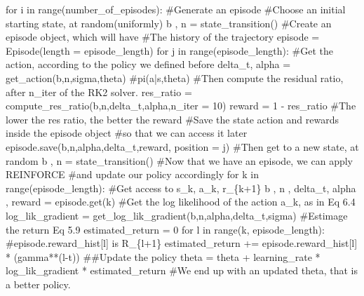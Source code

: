 \documentclass[
  letterpaper,
]{report}
\newenvironment{Shaded}{\begin{snugshade}}{\end{snugshade}}
\newcommand{\BuiltInTok}[1]{\textcolor[rgb]{0.00,0.23,0.31}{#1}}
\newcommand{\CommentTok}[1]{\textcolor[rgb]{0.37,0.37,0.37}{#1}}
\newcommand{\ControlFlowTok}[1]{\textcolor[rgb]{0.00,0.23,0.31}{#1}}
\newcommand{\DecValTok}[1]{\textcolor[rgb]{0.68,0.00,0.00}{#1}}
\newcommand{\KeywordTok}[1]{\textcolor[rgb]{0.00,0.23,0.31}{#1}}
\newcommand{\NormalTok}[1]{\textcolor[rgb]{0.00,0.23,0.31}{#1}}
\newcommand{\OperatorTok}[1]{\textcolor[rgb]{0.37,0.37,0.37}{#1}}
\theoremstyle{plain}
\theoremstyle{definition}
\theoremstyle{definition}
\theoremstyle{remark}
\begin{document}
\begin{Shaded}
\begin{Highlighting}[]
\ControlFlowTok{for}\NormalTok{ i }\KeywordTok{in} \BuiltInTok{range}\NormalTok{(number\_of\_episodes):}
    \CommentTok{\#Generate an episode}
    \CommentTok{\#Choose an initial starting state, at random(uniformly)}
\NormalTok{    b , n }\OperatorTok{=}\NormalTok{ state\_transition()}
    \CommentTok{\#Create an episode object, which will have }
    \CommentTok{\#The history of the trajectory}
\NormalTok{    episode }\OperatorTok{=}\NormalTok{ Episode(length }\OperatorTok{=}\NormalTok{ episode\_length)}
    \ControlFlowTok{for}\NormalTok{ j }\KeywordTok{in} \BuiltInTok{range}\NormalTok{(episode\_length):}
        \CommentTok{\#Get the action, according to the policy we defined before}
\NormalTok{        delta\_t, alpha }\OperatorTok{=}\NormalTok{ get\_action(b,n,sigma,theta) }\CommentTok{\#pi(a|s,theta)}
        \CommentTok{\#Then compute the residual ratio, after n\_iter of the RK2 solver.}
\NormalTok{        res\_ratio }\OperatorTok{=}\NormalTok{ compute\_res\_ratio(b,n,delta\_t,alpha,n\_iter }\OperatorTok{=} \DecValTok{10}\NormalTok{)}
\NormalTok{        reward }\OperatorTok{=} \DecValTok{1} \OperatorTok{{-}}\NormalTok{ res\_ratio }\CommentTok{\#The lower the res ratio, the better the reward}
        \CommentTok{\#Save the state action and rewards inside the episode object}
        \CommentTok{\#so that we can access it later}
\NormalTok{        episode.save(b,n,alpha,delta\_t,reward, position }\OperatorTok{=}\NormalTok{ j)}
        \CommentTok{\#Then get to a new state, at random}
\NormalTok{        b , n }\OperatorTok{=}\NormalTok{ state\_transition()}
    \CommentTok{\#Now that we have an episode, we can apply REINFORCE}
    \CommentTok{\#and update our policy accordingly}
    \ControlFlowTok{for}\NormalTok{ k }\KeywordTok{in} \BuiltInTok{range}\NormalTok{(episode\_length):}
        \CommentTok{\#Get access to s\_k, a\_k, r\_\{k+1\}}
\NormalTok{        b , n , delta\_t, alpha , reward }\OperatorTok{=}\NormalTok{ episode.get(k)}
        \CommentTok{\#Get the log likelihood of the action a\_k, as in Eq 6.4}
\NormalTok{        log\_lik\_gradient }\OperatorTok{=}\NormalTok{ get\_log\_lik\_gradient(b,n,alpha,delta\_t,sigma)}
        \CommentTok{\#Estimage the return Eq 5.9}
\NormalTok{        estimated\_return }\OperatorTok{=} \DecValTok{0}
        \ControlFlowTok{for}\NormalTok{ l }\KeywordTok{in} \BuiltInTok{range}\NormalTok{(k, episode\_length):}
            \CommentTok{\#episode.reward\_hist[l] is R\_\{l+1\}}
\NormalTok{            estimated\_return }\OperatorTok{+=}\NormalTok{ episode.reward\_hist[l] }\OperatorTok{*}\NormalTok{ (gamma}\OperatorTok{**}\NormalTok{(l}\OperatorTok{{-}}\NormalTok{t))}
        \CommentTok{\#\#Update the policy}
\NormalTok{        theta }\OperatorTok{=}\NormalTok{ theta }\OperatorTok{+}\NormalTok{ learning\_rate }\OperatorTok{*}\NormalTok{ log\_lik\_gradient }\OperatorTok{*}\NormalTok{ estimated\_return}
\CommentTok{\#We end up with an updated theta, that is a better policy.}
\end{Highlighting}
\end{Shaded}
\end{document}
